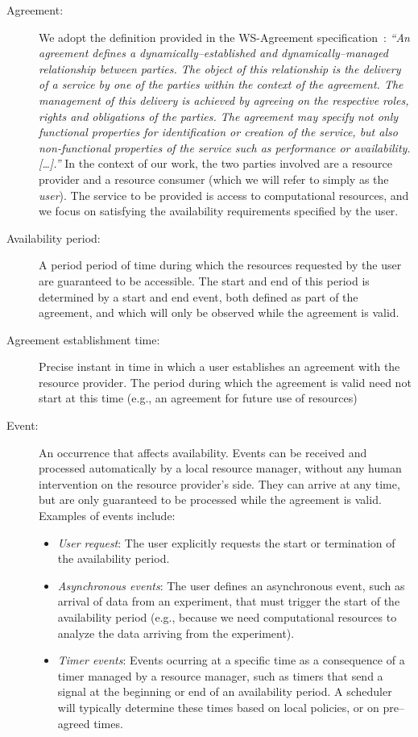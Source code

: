 \begin{description}
\item[Agreement:]  We adopt the definition provided in the WS-Agreement specification~\cite{wsag}: \emph{``An agreement defines a dynamically--established and dynamically--managed relationship between parties. The object of this relationship is the delivery
of a service by one of the parties within the context of the agreement. The management of this delivery is achieved by agreeing on the respective roles, rights and obligations of the parties. The agreement may specify not only functional properties for identification or creation of the service, but also non-functional properties of the service such as performance or availability. [\ldots].''} In the context of our work, the two parties involved are a resource provider and a resource consumer (which we will refer to simply as the \emph{user}). The service to be provided is access to computational resources, and we focus on satisfying the availability requirements specified by the user.
\item[Availability period:] A period period of time during which the resources requested by the user are guaranteed to be accessible. The start and end of this period is determined by a start and end event, both defined as part of the agreement, and which will only be observed while the agreement is valid.
\item[Agreement establishment time:] Precise instant in time in which a user establishes an agreement with the resource provider. The period during which the agreement is valid need not start at this time (e.g., an agreement for future use of resources)
\item[Event:] An occurrence that affects availability. Events can be received and processed automatically by a local resource manager, without any human intervention on the resource provider's side. They can arrive at any time, but are only guaranteed to be processed while the agreement is valid. Examples of events include:
\begin{itemize}
\item \emph{User request}: The user explicitly requests the start or termination of the availability period.
\item \emph{Asynchronous events}: The user defines an asynchronous event, such as arrival of data from an experiment, that must trigger the start of the availability period (e.g., because we need computational resources to analyze the data arriving from the experiment).
\item \emph{Timer events}: Events ocurring at a specific time as a consequence of a timer managed by a resource manager, such as timers that send a signal at the beginning or end of an availability period. A scheduler will typically determine these times based on local policies, or on pre--agreed times.
\end{itemize}
\end{description}



